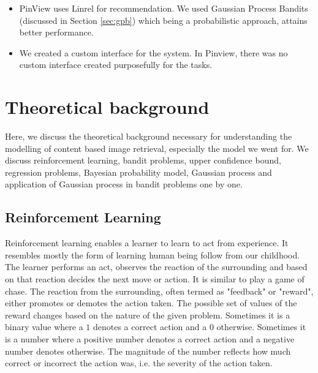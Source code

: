 \documentclass[english]{tktltiki}
\begin{document}
\begin{itemize}
	\item PinView uses Linrel for recommendation. We used Gaussian Process Bandits (discussed in Section \ref{sec:gpb}) which being a probabilistic approach, attains better performance.
	\item We created a custom interface for the system. In Pinview, there was no custom interface created purposefully for the tasks.
\end{itemize}

\section{Theoretical background}

Here, we discuss the theoretical background necessary for understanding the modelling of content based image retrieval, especially the model we went for. We discuss reinforcement learning, bandit problems, upper confidence bound, regression problems, Bayesian probability model, Gaussian process and application of Gaussian process in bandit problems one by one.


\subsection{Reinforcement Learning}

Reinforcement learning \cite{reinforcement_learning} enables a learner to learn to act from experience. It resembles mostly the form of learning human being follow from our childhood. The learner performs an act, observes the reaction of the surrounding and based on that reaction decides the next move or action. It is similar to play a game of chase. The reaction from the surrounding, often termed as "feedback" or "reward", either promotes or demotes the action taken. The possible set of values of the reward changes based on the nature of the given problem. Sometimes it is a binary value where a $1$ denotes a correct action and a $0$ otherwise. Sometimes it is a number where a positive number denotes a correct action and a negative number denotes otherwise. The magnitude of the number reflects how much correct or incorrect the action was, i.e. the severity of the action taken.
\end{document}
